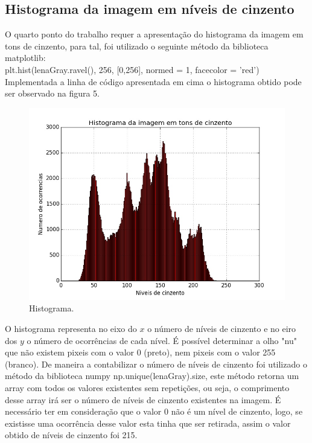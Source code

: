 \documentclass[12pt,a4paper]{article}
\begin{document}
\subsection{Histograma da imagem em níveis de cinzento}
O quarto ponto do trabalho requer a apresentação do histograma da imagem em tons de cinzento, para tal, foi utilizado o seguinte método da biblioteca matplotlib:\\
\newline
plt.hist(lenaGray.ravel(), 256, [0,256], normed = 1, facecolor = 'red')\\
\newline
Implementada a linha de código apresentada em cima o histograma obtido pode ser observado na figura 5.
\begin{figure}[h]
\includegraphics[scale=0.5]{histograma}
\centering
\caption{Histograma.}
\end{figure}

O histograma representa no eixo do $x$ o número de níveis de cinzento e no eiro dos $y$ o número de ocorrências de cada nível. É possível determinar a olho "nu" que não existem pixeis com o valor 0 (preto), nem pixeis com o valor 255 (branco). De maneira a contabilizar o número de níveis de cinzento foi utilizado o método da biblioteca numpy np.unique(lenaGray).size, este método retorna um array com todos os valores existentes sem repetições, ou seja, o comprimento desse array irá ser o número de níveis de cinzento existentes na imagem. É necessário ter em consideração que o valor 0 não é um nível de cinzento, logo, se existisse uma ocorrência desse valor esta tinha que ser retirada, assim o valor obtido de níveis de cinzento foi 215.
\end{document}
